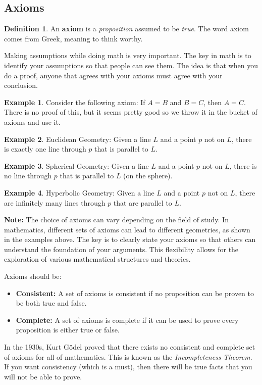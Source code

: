 \documentclass[11pt]{article}
\theoremstyle{definition}
\newtheorem{definition}{Definition}
\newtheorem{example}{Example}
\begin{document}
\subsection{Axioms}

\begin{definition}
  An \textbf{axiom} is a \textit{proposition} assumed to be \textit{true}. The word axiom comes from Greek, meaning to think worthy.
\end{definition}

Making assumptions while doing math is very important. The key in math is to identify your assumptions so that people can see them. The idea is that when you do a proof, anyone that agrees with your axioms must agree with your conclusion.

\begin{example}
  Consider the following axiom: If \( A = B \) and \( B = C \), then \( A = C \). There is no proof of this, but it seems pretty good so we throw it in the bucket of axioms and use it.
\end{example}

\begin{example}
  Euclidean Geometry: Given a line \( L \) and a point \( p \) not on \( L \), there is exactly one line through \( p \) that is parallel to \( L \).
\end{example}

\begin{example}
  Spherical Geometry: Given a line \( L \) and a point \( p \) not on \( L \), there is no line through \( p \) that is parallel to \( L \) (on the sphere).
\end{example}

\begin{example}
  Hyperbolic Geometry: Given a line \( L \) and a point \( p \) not on \( L \), there are infinitely many lines through \( p \) that are parallel to \( L \).
\end{example}

\textbf{Note:} The choice of axioms can vary depending on the field of study. In mathematics, different sets of axioms can lead to different geometries, as shown in the examples above. The key is to clearly state your axioms so that others can understand the foundation of your arguments. This flexibility allows for the exploration of various mathematical structures and theories.

Axioms should be:
\begin{itemize}
  \item \textbf{Consistent:} A set of axioms is consistent if no proposition can be proven to be both true and false.
  \item \textbf{Complete:} A set of axioms is complete if it can be used to prove every proposition is either true or false.
\end{itemize}

In the 1930s, Kurt Gödel proved that there exists no consistent and complete set of axioms for all of mathematics. This is known as the \textit{Incompleteness Theorem}. If you want consistency (which is a must), then there will be true facts that you will not be able to prove.
\end{document}
